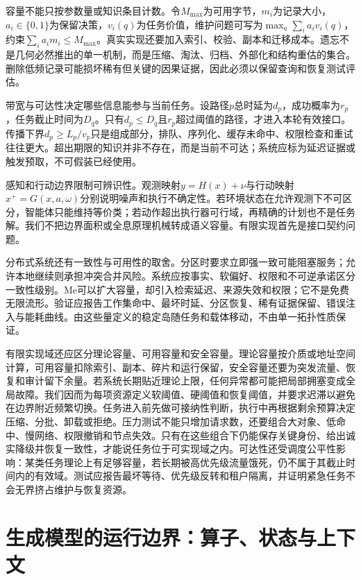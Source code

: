容量不能只按参数量或知识条目计数。令$M_{\max}$为可用字节，$m_i$为记录大小，$a_i\in\{0,1\}$为保留决策，$v_i(q)$为任务价值，维护问题可写为$\max_a\sum_i a_iv_i(q)$，约束$\sum_i a_im_i\le M_{\max}$。真实实现还要加入索引、校验、副本和迁移成本。遗忘不是几何必然推出的单一机制，而是压缩、淘汰、归档、外部化和结构重估的集合。删除低频记录可能损坏稀有但关键的因果证据，因此必须以保留查询和恢复测试评估。

带宽与可达性决定哪些信息能参与当前任务。设路径$p$总时延为$d_p$，成功概率为$r_p$，任务截止时间为$D_q$。只有$d_p\le D_q$且$r_p$超过阈值的路径，才进入本轮有效接口。传播下界$d_p\ge L_p/v_p$只是组成部分，排队、序列化、缓存未命中、权限检查和重试往往更大。超出期限的知识并非不存在，而是当前不可达；系统应标为延迟证据或触发预取，不可假装已经使用。

感知和行动边界限制可辨识性。观测映射$y=H(x)+\nu$与行动映射$x^+=G(x,a,\omega)$分别说明噪声和执行不确定性。若环境状态在允许观测下不可区分，智能体只能维持等价类；若动作超出执行器可行域，再精确的计划也不是任务解。我们不把边界面积或全息原理机械转成语义容量。有限实现首先是接口契约问题。

分布式系统还有一致性与可用性的取舍。分区时要求立即强一致可能阻塞服务；允许本地继续则承担冲突合并风险。系统应按事实、软偏好、权限和不可逆承诺区分一致性级别。Me可以扩大容量，却引入检索延迟、来源失效和权限；它不是免费无限流形。验证应报告工作集命中、最坏时延、分区恢复、稀有证据保留、错误注入与能耗曲线。由这些量定义的稳定岛随任务和载体移动，不由单一拓扑性质保证。

有限实现域还应区分理论容量、可用容量和安全容量。理论容量按介质或地址空间计算，可用容量扣除索引、副本、碎片和运行保留，安全容量还要为突发流量、恢复和审计留下余量。若系统长期贴近理论上限，任何异常都可能把局部拥塞变成全局故障。我们因而为每项资源定义软阈值、硬阈值和恢复阈值，并要求迟滞以避免在边界附近频繁切换。任务进入前先做可接纳性判断，执行中再根据剩余预算决定压缩、分批、卸载或拒绝。压力测试不能只增加请求数，还要组合大对象、低命中、慢网络、权限撤销和节点失效。只有在这些组合下仍能保存关键身份、给出诚实降级并恢复一致性，才能说任务位于可实现域之内。可达性还受调度公平性影响：某类任务理论上有足够容量，若长期被高优先级流量饿死，仍不属于其截止时间内的有效域。测试应报告最坏等待、优先级反转和租户隔离，并证明紧急任务不会无界挤占维护与恢复资源。

\section{生成模型的运行边界：算子、状态与上下文}
\label{sec:suspended_manifold}

